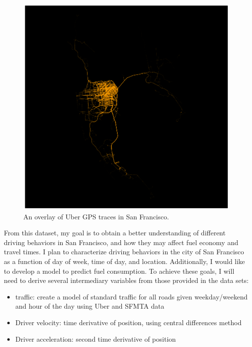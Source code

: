 \documentclass[12pt]{article}
\begin{document}
\begin{figure}[hbtp]
\caption{\label{fig:overlay}An overlay of Uber GPS traces in San Francisco.}
\begin{center}
\includegraphics[width=5in]{overlay_uber.png}
\end{center}
\end{figure}

From this dataset, my goal is to obtain a better understanding of different driving behaviors in San Francisco, and how they may affect fuel economy and travel times. I plan to characterize driving behaviors in the city of San Francisco as a function of day of week, time of day, and location. Additionally, I would like to develop a model to predict fuel consumption. To achieve these goals, I will need to derive several intermediary variables from those provided in the data sets:

\begin{itemize}
\item traffic: create a model of standard traffic for all roads given weekday/weekend and hour of the day using Uber and SFMTA data
\item Driver velocity: time derivative of position, using central differences method
\item Driver acceleration: second time derivative of position
\end{itemize}
\end{document}
